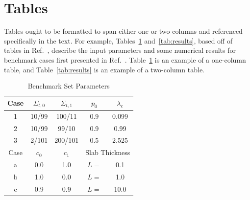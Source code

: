 \documentclass{article}                                                                           %
\begin{document}
\section{Tables}
\label{sec:tables}

Tables ought to be formatted to span either one or two columns and referenced specifically in the text.
For example, Tables~\ref{tab:params} and~\ref{tab:results}, based off of tables in Ref.~\cite{BrantleyMC2009Incident}, describe the input parameters and some numerical results for benchmark cases first presented in Ref.~\cite{AdamsJQSRT1989}.
Table~\ref{tab:params} is an example of a one-column table, and Table~\ref{tab:results} is an example of a two-column table.

\begin{table}%
\centering
\caption{Benchmark Set Parameters}
\label{tab:params}
\begin{tabular}{|ccccc|}
\hline
    Case & \(\Sigma_{t,0}\) & \(\Sigma_{t,1}\) & \(p_0\) & \(\lambda_c\) \\ \hline
    1               & 10/99 & 100/11 & 0.9 & 0.099\\
    2               & 10/99 & 99/10   & 0.9 & 0.99 \\
    3               & 2/101 & 200/101  & 0.5 & 2.525 \\ \hline
\hline
    Case  & $c_0$ & $c_1$ &  \multicolumn{2}{|c|}{Slab Thickness}  \\ \hline
    a               & 0.0 & 1.0 & \multicolumn{1}{|c}{\(L=\)} & 0.1 \\
    b               & 1.0 & 0.0 & \multicolumn{1}{|c}{\(L=\)} & 1.0 \\
    c               & 0.9 & 0.9 & \multicolumn{1}{|c}{\(L=\)} & 10.0 \\ \hline
\end{tabular}
\end{table}
\end{document}
